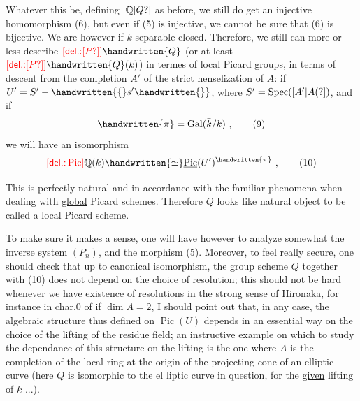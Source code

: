 Whatever this be, defining $[\mathbb{Q}|Q?]$ as before, we still do get an injective homomorphism (6), but even if (5) is injective, we cannot be sure that (6) is bijective. We are however if $k$  separable closed. Therefore, we still  can more or less describe $\deleted{\unsure{P}}\handwritten{Q}$ (or at least $\deleted{\unsure{P}}\handwritten{Q}(k)$) in termes of local Picard groups, in terms of  descent from the completion $A'$ of the strict henselization of $A$: if $U'=S'-\handwritten{\{}s'\handwritten{\}}$, where $S'=\operatorname{Spec}([A'|A(?])$, and if
\[
\handwritten{\pi}=\operatorname{Gal}(\bar{k}/k)\ ,
\tag*{(9)}
\]
we will have an isomorphism
\[
\deleted{\operatorname{Pic}}\mathbb{Q}(k)\handwritten{\simeq}\underline{\operatorname{Pic}}(U')^{\handwritten{\pi}}\ ,
\tag*{(10)}
\]

This is perfectly natural and in accordance with the familiar phenomena when dealing with \uline{global} Picard schemes. Therefore $Q$ looks like  natural object to be called a  local Picard scheme.

To make sure it makes a sense, one will have however to analyze somewhat the inverse system $(P_n)$, and the morphism (5). Moreover, to feel really secure, one should check that up to canonical isomorphism, the group scheme $Q$ together with (10) does not depend on the choice of
 resolution; this should not be hard whenever we have existence of resolutions in the strong sense of Hironaka, for instance in char.$0$ of if $\dim A=2$,  I should point out that, in any case, the algebraic structure thus defined on $\operatorname{Pic}(U)$ depends in an essential way on the choice of the lifting of the residue field; an instructive example on which to study the dependance of this structure on the lifting is the one where $A$ is the completion of the local ring at the origin of the projecting cone of an elliptic curve (here $Q$ is isomorphic to the el liptic curve in question, for the \uline{given} lifting of $k$ ...).

